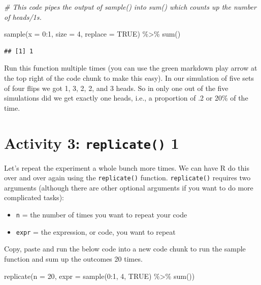 \documentclass[
  oneside]{book}
\newenvironment{Shaded}{\begin{snugshade}}{\end{snugshade}}
\newcommand{\AttributeTok}[1]{\textcolor[rgb]{0.77,0.63,0.00}{#1}}
\newcommand{\CommentTok}[1]{\textcolor[rgb]{0.56,0.35,0.01}{\textit{#1}}}
\newcommand{\ConstantTok}[1]{\textcolor[rgb]{0.00,0.00,0.00}{#1}}
\newcommand{\DecValTok}[1]{\textcolor[rgb]{0.00,0.00,0.81}{#1}}
\newcommand{\FunctionTok}[1]{\textcolor[rgb]{0.00,0.00,0.00}{#1}}
\newcommand{\NormalTok}[1]{#1}
\newcommand{\SpecialCharTok}[1]{\textcolor[rgb]{0.00,0.00,0.00}{#1}}
\providecommand{\tightlist}{%
  \setlength{\itemsep}{0pt}\setlength{\parskip}{0pt}}
\begin{document}
\begin{Shaded}
\begin{Highlighting}[]
\CommentTok{\# This code pipes the output of sample() into sum() which counts up the number of heads/1s.}

\FunctionTok{sample}\NormalTok{(}\AttributeTok{x =} \DecValTok{0}\SpecialCharTok{:}\DecValTok{1}\NormalTok{, }\AttributeTok{size =} \DecValTok{4}\NormalTok{, }\AttributeTok{replace =} \ConstantTok{TRUE}\NormalTok{) }\SpecialCharTok{\%\textgreater{}\%} \FunctionTok{sum}\NormalTok{()}
\end{Highlighting}
\end{Shaded}

\begin{verbatim}
## [1] 1
\end{verbatim}

Run this function multiple times (you can use the green markdown play arrow at the top right of the code chunk to make this easy). In our simulation of five sets of four flips we got 1, 3, 2, 2, and 3 heads. So in only one out of the five simulations did we get exactly one heads, i.e., a proportion of .2 or 20\% of the time.

\hypertarget{activity-3-replicate-1}{%
\section{\texorpdfstring{Activity 3: \texttt{replicate()} 1}{Activity 3: replicate() 1}}\label{activity-3-replicate-1}}

Let's repeat the experiment a whole bunch more times. We can have R do this over and over again using the \texttt{replicate()} function. \texttt{replicate()} requires two arguments (although there are other optional arguments if you want to do more complicated tasks):

\begin{itemize}
\tightlist
\item
  \texttt{n} = the number of times you want to repeat your code\\
\item
  \texttt{expr} = the expression, or code, you want to repeat
\end{itemize}

Copy, paste and run the below code into a new code chunk to run the sample function and sum up the outcomes 20 times.

\begin{Shaded}
\begin{Highlighting}[]
\FunctionTok{replicate}\NormalTok{(}\AttributeTok{n =} \DecValTok{20}\NormalTok{, }\AttributeTok{expr =} \FunctionTok{sample}\NormalTok{(}\DecValTok{0}\SpecialCharTok{:}\DecValTok{1}\NormalTok{, }\DecValTok{4}\NormalTok{, }\ConstantTok{TRUE}\NormalTok{) }\SpecialCharTok{\%\textgreater{}\%} \FunctionTok{sum}\NormalTok{())}
\end{Highlighting}
\end{Shaded}
\end{document}
